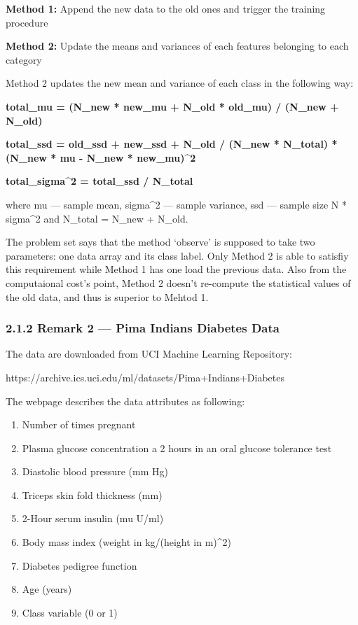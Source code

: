 \documentclass{article}
\begin{document}
\textbf{Method 1:} Append the new data to the old ones and trigger the
training procedure

\textbf{Method 2:} Update the means and variances of each features
belonging to each category

Method 2 updates the new mean and variance of each class in the
following way:

\textbf{total\_mu = (N\_new * new\_mu + N\_old * old\_mu) / (N\_new +
N\_old)}

\textbf{total\_ssd = old\_ssd + new\_ssd + N\_old / (N\_new * N\_total)
* (N\_new * mu - N\_new * new\_mu)\^{}2}

\textbf{total\_sigma\^{}2 = total\_ssd / N\_total}

where mu --- sample mean, sigma\^{}2 --- sample variance, ssd --- sample
size N * sigma\^{}2 and N\_total = N\_new + N\_old.

The problem set says that the method `observe' is supposed to take two
parameters: one data array and its class label. Only Method 2 is able to
satisfiy this requirement while Method 1 has one load the previous data.
Also from the computaional cost's point, Method 2 doesn't re-compute the
statistical values of the old data, and thus is superior to Mehtod 1.

    \subsubsection{2.1.2 Remark 2 --- Pima Indians Diabetes
Data}\label{remark-2-pima-indians-diabetes-data}

The data are downloaded from UCI Machine Learning Repository:

https://archive.ics.uci.edu/ml/datasets/Pima+Indians+Diabetes

The webpage describes the data attributes as following:

\begin{enumerate}
\def\labelenumi{\arabic{enumi}.}
\itemsep1pt\parskip0pt
\item
  Number of times pregnant
\item
  Plasma glucose concentration a 2 hours in an oral glucose tolerance
  test
\item
  Diastolic blood pressure (mm Hg)
\item
  Triceps skin fold thickness (mm)
\item
  2-Hour serum insulin (mu U/ml)
\item
  Body mass index (weight in kg/(height in m)\^{}2)
\item
  Diabetes pedigree function
\item
  Age (years)
\item
  Class variable (0 or 1)
\end{enumerate}
\end{document}
